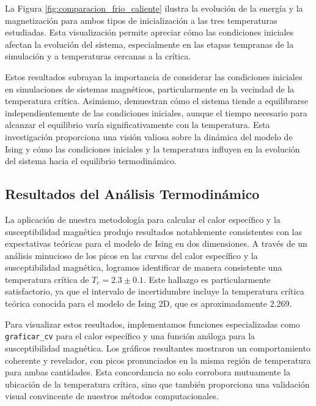 \documentclass[twocolumn]{article}
\begin{document}
La Figura \ref{fig:comparacion_frio_caliente} ilustra la evolución de la energía y la magnetización para ambos tipos de inicialización a las tres temperaturas estudiadas. Esta visualización permite apreciar cómo las condiciones iniciales afectan la evolución del sistema, especialmente en las etapas tempranas de la simulación y a temperaturas cercanas a la crítica.


Estos resultados subrayan la importancia de considerar las condiciones iniciales en simulaciones de sistemas magnéticos, particularmente en la vecindad de la temperatura crítica. Asimismo, demuestran cómo el sistema tiende a equilibrarse independientemente de las condiciones iniciales, aunque el tiempo necesario para alcanzar el equilibrio varía significativamente con la temperatura. Esta investigación proporciona una visión valiosa sobre la dinámica del modelo de Ising y cómo las condiciones iniciales y la temperatura influyen en la evolución del sistema hacia el equilibrio termodinámico.

\subsection*{Resultados del Análisis Termodinámico}

La aplicación de nuestra metodología para calcular el calor específico y la susceptibilidad magnética produjo resultados notablemente consistentes con las expectativas teóricas para el modelo de Ising en dos dimensiones. A través de un análisis minucioso de los picos en las curvas del calor específico y la susceptibilidad magnética, logramos identificar de manera consistente una temperatura crítica de $T_c = 2.3 \pm 0.1$. Este hallazgo es particularmente satisfactorio, ya que el intervalo de incertidumbre incluye la temperatura crítica teórica conocida para el modelo de Ising 2D, que es aproximadamente 2.269.

Para visualizar estos resultados, implementamos funciones especializadas como \texttt{graficar\_cv} para el calor específico y una función análoga para la susceptibilidad magnética. Los gráficos resultantes mostraron un comportamiento coherente y revelador, con picos pronunciados en la misma región de temperatura para ambas cantidades. Esta concordancia no solo corrobora mutuamente la ubicación de la temperatura crítica, sino que también proporciona una validación visual convincente de nuestros métodos computacionales.
\end{document}
